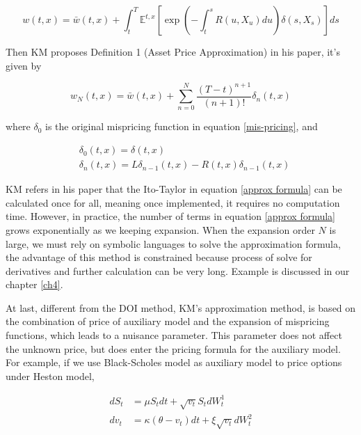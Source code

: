 \begin{equation}
    w(t, x)=\bar{w}(t,x)+\int_{t}^{T} \mathbb{E}^{t,x}\left[\exp \left(-\int_{t}^{s} R(u, X_u) d u\right) \delta(s,X_s)\right] d s
\end{equation}

\noindent Then KM proposes Definition 1 (Asset Price Approximation) in his paper, it's given by

\begin{equation}\label{approx formula}
    w_{N}(t, x)=\bar{w}(t,x)+\sum_{n=0}^{N} \frac{(T-t)^{n+1}}{(n+1) !} \delta_{n}(t, x)
\end{equation}

\noindent where $\delta_0$ is the original mispricing function in equation \eqref{mis-pricing}, and

\begin{equation}
    \begin{aligned}
        &\delta_0(t,x) = \delta(t,x) \\
        &\delta_{n}(t, x)=L \delta_{n-1}(t, x)-R(t, x) \delta_{n-1}(t, x)
        \end{aligned}
\end{equation}

KM refers in his paper that the Ito-Taylor in equation \eqref{approx formula} can be calculated once for all, meaning once implemented, it requires no computation time. However, in practice, the number of terms in equation \eqref{approx formula} grows exponentially as we keeping expansion. When the expansion order $N$ is large, we must rely on symbolic languages to solve the approximation formula, the advantage of this method is constrained because process of solve for derivatives and further calculation can be very long. Example is discussed in our chapter \ref{ch4}.

At last, different from the DOI method, KM's approximation method, is based on the combination of price of auxiliary model and the expansion of mispricing functions, which leads to a nuisance parameter. This parameter does not affect the unknown price, but does enter the pricing formula for the auxiliary model. For example, if we use Black-Scholes model as auxiliary model to price options under Heston model, 

$$
\begin{aligned}
    d S_{t}&=\mu S_{t} d t+\sqrt{v_{t}} S_{t} d W_{t}^{1} \\
    d v_{t}&=\kappa\left(\theta-v_{t}\right) d t+\xi \sqrt{v_{t}} d W_{t}^{2}
\end{aligned}
$$

